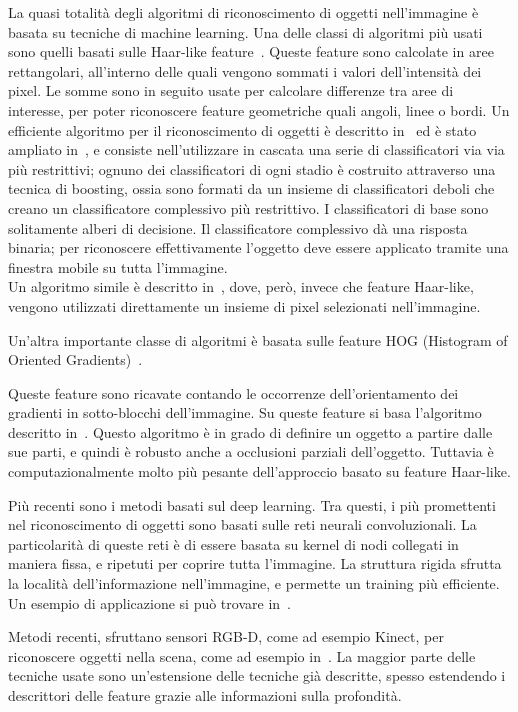 La quasi totalità degli algoritmi di riconoscimento di oggetti nell'immagine è basata su tecniche di machine learning.
Una delle classi di algoritmi più usati sono quelli basati sulle Haar-like feature~\cite{710772}.
Queste feature sono calcolate in aree rettangolari, all'interno delle quali vengono sommati i valori dell'intensità dei pixel. Le somme sono in seguito usate per calcolare differenze tra aree di interesse, per poter riconoscere feature geometriche quali angoli, linee o bordi.
Un efficiente algoritmo per il riconoscimento di oggetti è descritto in~\cite{Viola01rapidobject} ed è stato ampliato in~\cite{Lienhart02anextended}, e consiste nell'utilizzare in cascata una serie di classificatori via via più restrittivi; ognuno dei classificatori di ogni stadio è costruito attraverso una tecnica di boosting, ossia sono formati da un insieme di classificatori deboli che creano un classificatore complessivo più restrittivo. I classificatori di base sono solitamente alberi di decisione. Il classificatore complessivo dà una risposta binaria; per riconoscere effettivamente l'oggetto deve essere applicato tramite una finestra mobile su tutta l'immagine. \\
Un algoritmo simile è descritto in~\cite{journals/ijista/AbramsonSG07}, dove, però, invece che feature Haar-like, vengono utilizzati direttamente un insieme di pixel selezionati nell'immagine.

Un'altra importante classe di algoritmi è basata sulle feature HOG (Histogram of Oriented Gradients)~\cite{1467360}.

Queste feature sono ricavate contando le occorrenze dell'orientamento dei gradienti in sotto-blocchi dell'immagine.
Su queste feature si basa l'algoritmo descritto in~\cite{lsvm-pami}. Questo algoritmo è in grado di definire un oggetto a partire dalle sue parti, e quindi è robusto anche a occlusioni parziali dell'oggetto. Tuttavia è computazionalmente molto più pesante dell'approccio basato su feature Haar-like.

Più recenti sono i metodi basati sul deep learning. Tra questi, i più promettenti nel riconoscimento di oggetti sono basati sulle reti neurali convoluzionali. La particolarità di queste reti è di essere basata su kernel di nodi collegati in maniera fissa, e ripetuti per coprire tutta l'immagine. La struttura rigida sfrutta la località dell'informazione nell'immagine, e permette un training più efficiente.
Un esempio di applicazione si può trovare in~\cite{NIPS2012_4824}.

Metodi recenti, sfruttano sensori RGB-D, come ad esempio Kinect, per riconoscere oggetti nella scena, come ad esempio in~\cite{lai2012detection}. La maggior parte delle tecniche usate sono un'estensione delle tecniche già descritte, spesso estendendo i descrittori delle feature grazie alle informazioni sulla profondità.

